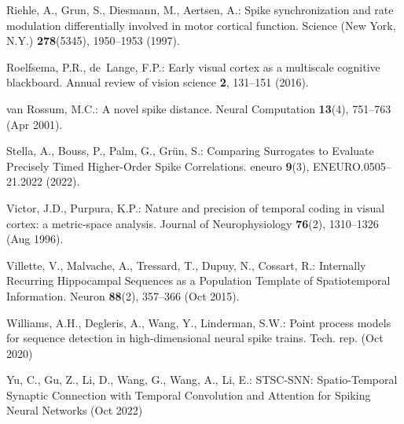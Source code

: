 \documentclass[runningheads]{llncs}
\begin{document}
\begin{thebibliography}{10}
  Riehle, A., Grun, S., Diesmann, M., Aertsen, A.: Spike synchronization and rate modulation differentially involved in motor cortical function. Science (New York, N.Y.)  \textbf{278}(5345),  1950--1953 (1997). %
  
  Roelfsema, P.R., de~Lange, F.P.: Early visual cortex as a multiscale cognitive blackboard. Annual review of vision science  \textbf{2},  131--151 (2016). %
  
  van Rossum, M.C.: A novel spike distance. Neural Computation  \textbf{13}(4),  751--763 (Apr 2001). 
  
  Stella, A., Bouss, P., Palm, G., Grün, S.: Comparing {Surrogates} to {Evaluate} {Precisely} {Timed} {Higher}-{Order} {Spike} {Correlations}. eneuro  \textbf{9}(3),  ENEURO.0505--21.2022 (2022). %
  
  Victor, J.D., Purpura, K.P.: Nature and precision of temporal coding in visual cortex: a metric-space analysis. Journal of Neurophysiology  \textbf{76}(2),  1310--1326 (Aug 1996). %
  
  Villette, V., Malvache, A., Tressard, T., Dupuy, N., Cossart, R.: Internally {Recurring} {Hippocampal} {Sequences} as a {Population} {Template} of {Spatiotemporal} {Information}. Neuron  \textbf{88}(2),  357--366 (Oct 2015). %
  
  Williams, A.H., Degleris, A., Wang, Y., Linderman, S.W.: Point process models for sequence detection in high-dimensional neural spike trains. Tech. rep. (Oct 2020)%
  
  Yu, C., Gu, Z., Li, D., Wang, G., Wang, A., Li, E.: {STSC}-{SNN}: {Spatio}-{Temporal} {Synaptic} {Connection} with {Temporal} {Convolution} and {Attention} for {Spiking} {Neural} {Networks} (Oct 2022)%
  
  \end{thebibliography}
  
\end{document}
